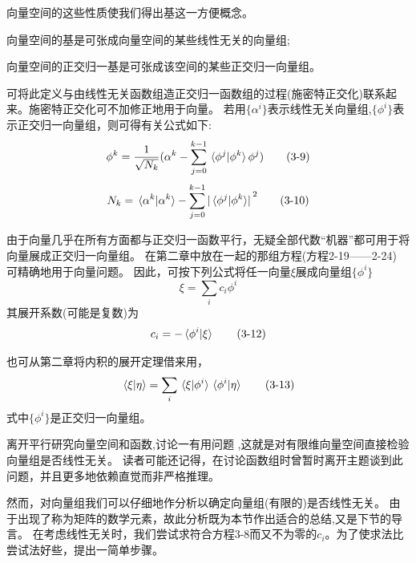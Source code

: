 向量空间的这些性质使我们得出基这一方便概念。

\begin{definition}[基，正交归一基]
    向量空间的基是可张成向量空间的某些线性无关的向量组;
    
    向量空间的正交归一基是可张成该空间的某些正交归一向量组。
\end{definition}

可将此定义与由线性无关函数组造正交归一函数组的过程(施密特正交化)联系起来。施密特正交化可不加修正地用于向量。
若用$\{\alpha^i\}$表示线性无关向量组,$\{\phi^i\}$表示正交归一向量组，则可得有关公式如下:
\[\phi^k=\frac{1}{\sqrt{N_k}}(\alpha^k-\sum_{j=0}^{k-1}\bra*{\phi^j}\ket*{\phi^k}\phi^j) \tag{3-9}\]
\[N_k=\bra*{\alpha^k}\ket*{\alpha^k}-\sum_{j=0}^{k-1}\abs*{\bra*{\phi^j}\ket*{\phi^k}}^2 \tag{3-10}\]

由于向量几乎在所有方面都与正交归一函数平行，无疑全部代数“机器”都可用于将向量展成正交归一向量组。
在第二章中放在一起的那组方程(方程2-19——2-24) 可精确地用于向量问题。
因此，可按下列公式将任一向量$\xi$展成向量组$\{\phi^i\}$
\[\xi=\sum_ic_i\phi^i \tag{3-11}\]
其展开系数(可能是复数)为
\[c_i=-\bra*{\phi^i}\ket*{\xi} \tag{3-12}\]

也可从第二章将内积的展开定理借来用，
\[\bra*{\xi}\ket*{\eta}=\sum_i\bra*{\xi}\ket*{\phi^i}\bra*{\phi^i}\ket*{\eta} \tag{3-13}\]
式中$\{\phi^i\}$是正交归一向量组。

离开平行研究向量空间和函数,讨论一有用问题 ,这就是对有限维向量空间直接检验向量组是否线性无关。
读者可能还记得，在讨论函数组时曾暂时离开主题谈到此问题，并且更多地依赖直觉而非严格推理。

然而，对向量组我们可以仔细地作分析以确定向量组(有限的)是否线性无关。
由于出现了称为矩阵的数学元素，故此分析既为本节作出适合的总结,又是下节的导言。
在考虑线性无关时，我们尝试求符合方程3-8而又不为零的$c_i$。为了使求法比尝试法好些，提出一简单步骤。

